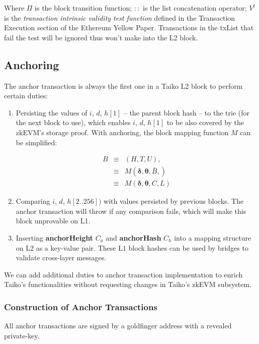 \documentclass[9pt,oneside]{amsart}
\begin{document}
\begin{multicols}{2}
Where $\Pi$ is the block transition function; $::$ is the list concatenation operator; $V^t$ is the \textit{transaction intrinsic validity test function} defined in the Transaction Execution section of the Ethereum Yellow Paper. Transactions in the txList that fail the test will be ignored thus won't make into the L2 block.


\subsection{Anchoring} \label{sec:anchoring}

The anchor transaction is always the first one in a Taiko L2 block to perform certain duties:

\begin{enumerate}
\item Persisting the values of $i$, $d$, $h[1]$ -- the parent block hash -- to the trie (for the next block to use), which enables $i$, $d$, $h[1]$ to be also covered by the zkEVM's storage proof.   With anchoring, the block mapping function $M$  can be simplified:

\begin{eqnarray}
B & \equiv & (H, T, U), \\
\nonumber & \equiv &  M(\boldsymbol{\delta}, \boldsymbol{\theta}, \bar{B}, )  \\
\nonumber & \equiv & M(\boldsymbol{\delta},  \boldsymbol{\theta}, C, L)
\end{eqnarray}

\item Comparing $i$, $d$, $h[2..256])$ with values persisted by previous blocks. The anchor transaction will throw if any comparison fails, which will make this block unprovable on L1.
\item Inserting \textbf{anchorHeight} $C_a$ and \textbf{anchorHash} $C_h$ into a mapping structure on L2 as a key-value pair. These L1 block hashes can be used by bridges to validate cross-layer messages.
\end{enumerate}

We can add additional duties to anchor transaction implementation to enrich Taiko's functionalities without requesting changes in Taiko's zkEVM subsystem.

\subsubsection{Construction of Anchor Transactions} All anchor transactions are signed by a goldfinger address with a revealed private-key. 


\end{multicols}
\end{document}
